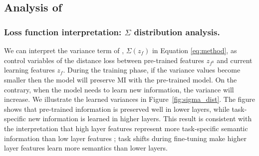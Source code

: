 \subsection{Analysis of \method{}}


\subsubsection{Loss function interpretation: $\Sigma$ distribution analysis.}
We can interpret the variance term of \method{}, $\Sigma(z_f)$ in Equation \eqref{eq:method}, as control variables of the distance loss between pre-trained features $z_{f^0}$ and current learning features $z_f$. During the training phase, if the variance values become smaller then the model will preserve MI with the pre-trained model.
On the contrary, when the model needs to learn new information, the variance will increase. We illustrate the learned variances in Figure~\ref{fig:sigma_dist}. The figure shows that pre-trained information is preserved well in lower layers, while task-specific new information is learned in higher layers.
This result is consistent with the interpretation that high layer features represent more task-specific semantic information than low layer features \cite{erhan2009visualizing}; task shifts during fine-tuning make higher layer features learn more semantics than lower layers.


% 
% 

